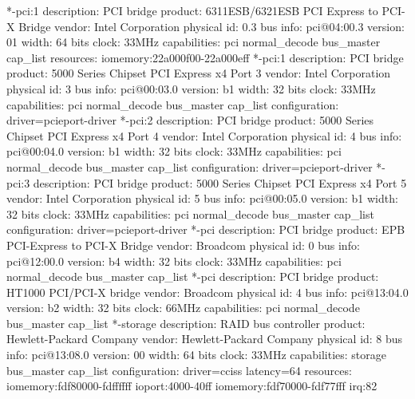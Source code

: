 \documentclass[mingoth,a4paper]{jsarticle}
\begin{document}
\begin{commandline}
           *-pci:1
                description: PCI bridge
                product: 6311ESB/6321ESB PCI Express to PCI-X Bridge
                vendor: Intel Corporation
                physical id: 0.3
                bus info: pci@04:00.3
                version: 01
                width: 64 bits
                clock: 33MHz
                capabilities: pci normal_decode bus_master cap_list
                resources: iomemory:22a000f00-22a000eff
        *-pci:1
             description: PCI bridge
             product: 5000 Series Chipset PCI Express x4 Port 3
             vendor: Intel Corporation
             physical id: 3
             bus info: pci@00:03.0
             version: b1
             width: 32 bits
             clock: 33MHz
             capabilities: pci normal_decode bus_master cap_list
             configuration: driver=pcieport-driver
        *-pci:2
             description: PCI bridge
             product: 5000 Series Chipset PCI Express x4 Port 4
             vendor: Intel Corporation
             physical id: 4
             bus info: pci@00:04.0
             version: b1
             width: 32 bits
             clock: 33MHz
             capabilities: pci normal_decode bus_master cap_list
             configuration: driver=pcieport-driver
        *-pci:3
             description: PCI bridge
             product: 5000 Series Chipset PCI Express x4 Port 5
             vendor: Intel Corporation
             physical id: 5
             bus info: pci@00:05.0
             version: b1
             width: 32 bits
             clock: 33MHz
             capabilities: pci normal_decode bus_master cap_list
             configuration: driver=pcieport-driver
           *-pci
                description: PCI bridge
                product: EPB PCI-Express to PCI-X Bridge
                vendor: Broadcom
                physical id: 0
                bus info: pci@12:00.0
                version: b4
                width: 32 bits
                clock: 33MHz
                capabilities: pci normal_decode bus_master cap_list
              *-pci
                   description: PCI bridge
                   product: HT1000 PCI/PCI-X bridge
                   vendor: Broadcom
                   physical id: 4
                   bus info: pci@13:04.0
                   version: b2
                   width: 32 bits
                   clock: 66MHz
                   capabilities: pci normal_decode bus_master cap_list
              *-storage
                   description: RAID bus controller
                   product: Hewlett-Packard Company
                   vendor: Hewlett-Packard Company
                   physical id: 8
                   bus info: pci@13:08.0
                   version: 00
                   width: 64 bits
                   clock: 33MHz
                   capabilities: storage bus_master cap_list
                   configuration: driver=cciss latency=64
                   resources: iomemory:fdf80000-fdffffff ioport:4000-40ff iomemory:fdf70000-fdf77fff irq:82
\end{commandline}
\end{document}
